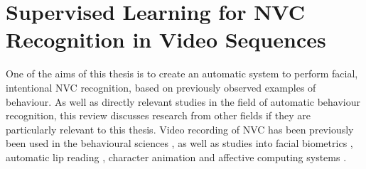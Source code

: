 

\section{Supervised Learning for \ac{NVC} Recognition in Video Sequences}

One of the aims of this thesis is to create an automatic system to perform facial, intentional \ac{NVC} recognition, based on previously observed examples of behaviour. As well as directly relevant studies in the field of automatic behaviour recognition, this review discusses research from other fields if they are particularly relevant to this thesis. Video recording of \ac{NVC} has been previously been used in the behavioural sciences \cite{Matsumoto1991}, as well as studies into facial biometrics \cite{Goswami2010}, automatic lip reading \cite{Ong2011}, character animation \cite{Bickel2008} and affective computing systems \cite{Pantic2008, Bartlett2010, Zeng2009}.

